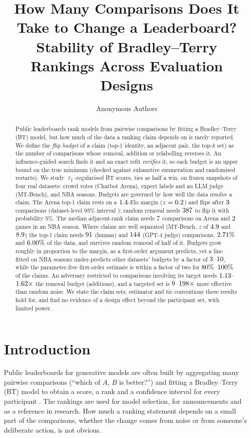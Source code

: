 \documentclass{article}
\title{How Many Comparisons Does It Take to Change a Leaderboard?\\
       Stability of Bradley--Terry Rankings Across Evaluation Designs}
\author{Anonymous Authors}
\begin{document}
\maketitle

\begin{abstract}
Public leaderboards rank models from pairwise comparisons by fitting a Bradley--Terry (BT) model, but how much of the data a ranking claim depends on is rarely reported. We define the \emph{flip budget} of a claim (top-1 identity, an adjacent pair, the top-$k$ set) as the number of comparisons whose removal, addition or relabelling reverses it. An influence-guided search finds it and an exact refit \emph{verifies} it, so each budget is an upper bound on the true minimum (checked against exhaustive enumeration and randomised restarts). We study $\ell_2$-regularised BT scores, ties as half a win, on frozen snapshots of four real datasets: crowd votes (Chatbot Arena), expert labels and an LLM judge (MT-Bench), and NBA seasons. Budgets are governed by how well the data resolve a claim. The Arena top-1 claim rests on a $1.4$-Elo margin ($z=0.2$) and flips after $3$ comparisons (dataset-level 95\% interval \biArenaConeRange); random removal needs $387$ to flip it with probability 5\%. The median adjacent-rank claim needs $7$ comparisons on Arena and $2$ games in an NBA season. Where claims are well separated (MT-Bench, $z$ of $4.9$ and $8.9$) the top-1 claim needs $91$ (human) and $144$ (GPT-4 judge) comparisons, $2.71\%$ and $6.00\%$ of the data, and survives random removal of half of it. Budgets grow roughly in proportion to the margin, as a first-order argument predicts, yet a line fitted on NBA seasons under-predicts other datasets' budgets by a factor of $3$--$10$, while the parameter-free first-order estimate is within a factor of two for $80\%$--$100\%$ of the claims. An adversary restricted to comparisons involving its target needs $1.13$--$1.62\times$ the removal budget (additions), and a targeted set is $9$--$198\times$ more effective than random noise. We state the claim sets, estimator and tie conventions these results hold for, and find no evidence of a design effect beyond the participant set, with limited power.
\end{abstract}

\section{Introduction}
\label{sec:intro}
Public leaderboards for generative models are often built by aggregating many pairwise comparisons (``which of $A$, $B$ is better?'') and fitting a Bradley--Terry (BT) model \citep{bradley1952rank} to obtain a score, a rank and a confidence interval for every participant \citep{chiang2024arena}. The rankings are used for model selection, for announcements and as a reference in research. How much a ranking statement depends on a small part of the comparisons, whether the change comes from noise or from someone's deliberate action, is not obvious.
\end{document}
